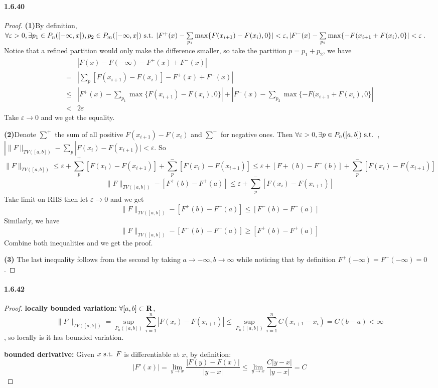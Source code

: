 \documentclass{article}
\begin{document}
\paragraph{1.6.40}
\begin{proof}
\textbf{(1)}By definition, $\forall\varepsilon>0,\exists p_1\in P_n([-\infty, x]), p_2\in P_m([-\infty,x])\text{ s.t. } |F^+(x)-\sum\limits_{p_1}\max\{F(x_{i+1})-F(x_i),0\}|<\varepsilon, |F^-(x)-\sum\limits_{p_2}\max\{-F(x_{i+1}+F(x_i),0\}|<\varepsilon$. Notice that a refined partition would only make the difference smaller, so take the partition $p=p_1+p_2$, we have 
\[\begin{aligned}
&|F(x)-F(-\infty)-F^+(x)+F^-(x)|\\
=&|\sum_{p}[F(x_{i+1})-F(x_i)]-F^+(x)+F^-(x)|\\
\leq&|F^+(x)-\sum\limits_{p_1}\max\{F(x_{i+1})-F(x_i),0\}|+|F^-(x)-\sum\limits_{p_2}\max\{-F(x_{i+1}+F(x_i),0\}|\\
<&2\varepsilon
\end{aligned}\]
Take $\varepsilon\to 0$ and we get the equality.

\textbf{(2)}Denote $\sum^+$ the sum of all positive $F(x_{i+1})-F(x_i)$ and $\sum^{-} $ for negative ones. Then $\forall\varepsilon>0, \exists p\in P_n([a,b])\text{ s.t. }$, $|\|F\|_{TV([a,b])}-\sum\limits_{p}|F(x_i)-F(x_{i+1})|<\varepsilon$. So 
\[\|F\|_{TV([a,b])}\leq \varepsilon+\sum^+_p[F(x_i)-F(x_{i+1})]+\sum^-_p[F(x_i)-F(x_{i+1})]\leq\varepsilon+ [F+(b)-F^-(b)]+\sum^-_p [F(x_i)-F(x_{i+1})]\]
\[\|F\|_{TV([a,b])}-[F^+(b)-F^+(a)]\leq \varepsilon + \sum^-_p[F(x_i)-F(x_{i+1})]\]
Take limit on RHS then let $\varepsilon\to 0$ and we get 
\[\|F\|_{TV([a,b])}-[F^+(b)-F^+(a)]\leq [F^-(b)-F^-(a)]\]
Similarly, we have 
\[\|F\|_{TV([a,b])}-[F^-(b)-F^-(a)]\geq [F^+(b)-F^+(a)]\]
Combine both inequalities and we get the proof.

\textbf{(3)} The last inequality follows from the second by taking $a\to -\infty, b\to \infty$ while noticing that by definition $F^+(-\infty)=F^-(-\infty)=0$.
\end{proof}

\paragraph{1.6.42}
\begin{proof}
\textbf{locally bounded variation:} $\forall [a,b]\subset \mathbf{R}$, \[\|F\|_{TV([a,b])}=\sup\limits_{P_n([a,b])}\sum\limits_{i=1}^n|F(x_i)-F(x_{i+1})|\leq \sup\limits_{P_n([a,b])}\sum\limits_{i=1}^n C(x_{i+1}-x_i)=C(b-a)<\infty\], so locally is it has bounded variation.

\textbf{bounded derivative:} Given $x\text{ s.t. } F$ is differentiable at $x$, by definition:
\[|F'(x)|=\lim_{y\to x}\frac{|F(y)-F(x)|}{|y-x|}\leq\lim_{y\to x}\frac{C|y-x|}{|y-x|}=C\] 
\end{proof}
\end{document}
